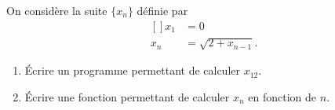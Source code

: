 \begin{exercice}\label{exoSC_serie5-0001}

	On considère la suite $\{ x_n \}$ définie par
	\begin{equation}
		\begin{aligned}[]
			x_1&=0\\
			x_n&=\sqrt{2+x_{n-1}}.
		\end{aligned}
	\end{equation}
	\begin{enumerate}

		\item
			Écrire un programme permettant de calculer $x_{12}$.
		\item
			Écrire une fonction permettant de calculer $x_n$ en fonction de $n$.

	\end{enumerate}

\end{exercice}
